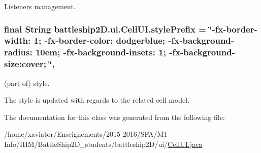 Listeners management. 

\hypertarget{classbattleship2D_1_1ui_1_1CellUI_a1f8674dbc8815be409813c8d097a110b}{
\subsubsection[{style\-Prefix}]{\setlength{\rightskip}{0pt plus 5cm}final String battleship2\-D.\-ui.\-Cell\-U\-I.\-style\-Prefix = \char`\"{}-\/fx-\/border-\/width\-: 1; -\/fx-\/border-\/color\-: dodgerblue; -\/fx-\/background-\/radius\-: 10em; -\/fx-\/background-\/insets\-: 1; -\/fx-\/background-\/size\-:cover; \char`\"{}\hspace{0.3cm}{\ttfamily [static]}, {\ttfamily [private]}}}\label{classbattleship2D_1_1ui_1_1CellUI_a1f8674dbc8815be409813c8d097a110b}


(part of) style. 

The style is updated with regards to the related cell model. 

The documentation for this class was generated from the following file\-:\begin{DoxyCompactItemize}
\item 
/home/xaviator/\-Enseignements/2015-\/2016/\-S\-F\-A/\-M1-\/\-Info/\-I\-H\-M/\-Battle\-Ship2\-D\-\_\-students/battleship2\-D/ui/\hyperlink{CellUI_8java}{Cell\-U\-I.\-java}\end{DoxyCompactItemize}
